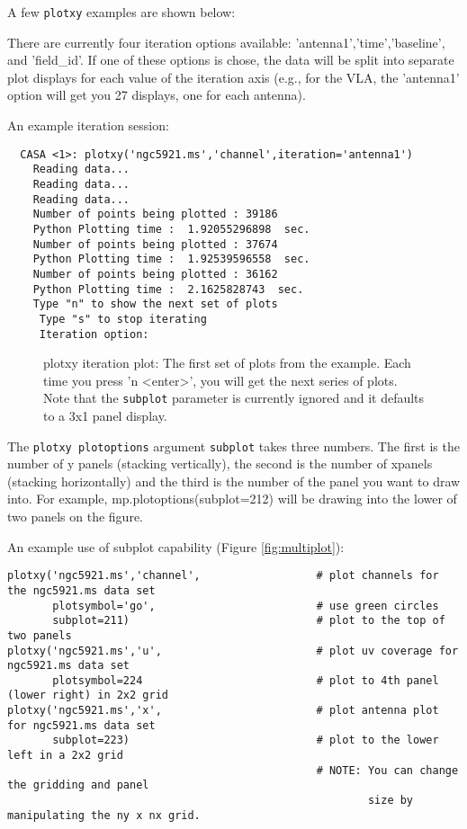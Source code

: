A few {\tt plotxy} examples are shown below: 

\vspace{3mm}

There are currently four iteration options available:
'antenna1','time','baseline', and 'field\_id'.  If one of these options
is chose, the data will be split into separate plot displays for each
value of the iteration axis (e.g., for the VLA, the 'antenna1' option
will get you 27 displays, one for each antenna).

An example iteration session:

\small
\begin{verbatim}
  CASA <1>: plotxy('ngc5921.ms','channel',iteration='antenna1')
    Reading data...
    Reading data...
    Reading data...
    Number of points being plotted : 39186
    Python Plotting time :  1.92055296898  sec.
    Number of points being plotted : 37674
    Python Plotting time :  1.92539596558  sec.
    Number of points being plotted : 36162
    Python Plotting time :  2.1625828743  sec.
    Type "n" to show the next set of plots 
     Type "s" to stop iterating 
     Iteration option: 
\end{verbatim}
\normalsize

\begin{figure}[h!]
\caption{\label{fig:msplotiteration} plotxy iteration plot: The first
  set of plots from the example. Each time you press 'n <enter>', you
  will get the next series of plots. Note that the {\tt subplot} parameter
  is currently ignored and it defaults to a 3x1 panel display.} 
\hrulefill
\end{figure}

\vspace{3mm}

The {\tt plotxy plotoptions} argument {\tt subplot} takes three
numbers. The first is the number of y panels (stacking vertically),
the second is the number of xpanels (stacking horizontally) and the
third is the number of the panel you want to draw into. For example,
mp.plotoptions(subplot=212) will be drawing into the lower of two
panels on the figure.

An example use of subplot capability (Figure \ref{fig:multiplot}):

\small
\begin{verbatim}
plotxy('ngc5921.ms','channel',                  # plot channels for the ngc5921.ms data set
       plotsymbol='go',                         # use green circles
       subplot=211)                             # plot to the top of two panels
plotxy('ngc5921.ms','u',                        # plot uv coverage for ngc5921.ms data set
       plotsymbol=224                           # plot to 4th panel (lower right) in 2x2 grid
plotxy('ngc5921.ms','x',                        # plot antenna plot for ngc5921.ms data set
       subplot=223)                             # plot to the lower left in a 2x2 grid
                                                # NOTE: You can change the gridding and panel 
                                                        size by manipulating the ny x nx grid.
\end{verbatim}
\normalsize

